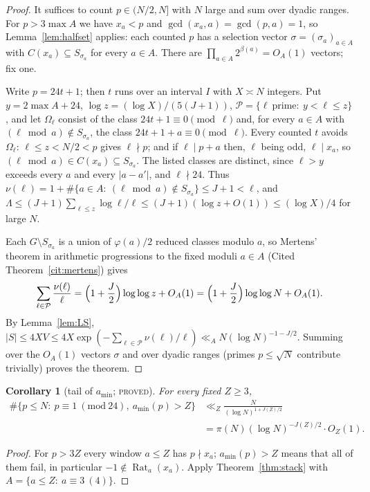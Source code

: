 \documentclass[11pt,reqno]{amsart}
\newtheorem{corollary}[theorem]{Corollary}
\theoremstyle{definition}
\newcommand{\Rat}{\operatorname{Rat}}
\newcommand{\amin}{a_{\min}}
\newcommand{\status}[1]{\textup{\textsc{#1}}}
\begin{document}
\begin{proof}
It suffices to count $p\in(N/2,N]$ with $N$ large and sum over dyadic
ranges.  For $p>3\max A$ we have $x_a<p$ and $\gcd(x_a,a)=\gcd(p,a)=1$, so
Lemma~\ref{lem:halfset} applies: each counted $p$ has a selection vector
$\sigma=(\sigma_a)_{a\in A}$ with $C(x_a)\subseteq S_{\sigma_a}$ for every
$a\in A$.  There are $\prod_{a\in A}2^{\beta(a)}=O_A(1)$ vectors; fix one.

Write $p=24t+1$; then $t$ runs over an interval $I$ with
$X\asymp N$ integers.  Put $y=2\max A+24$, $\log z=(\log X)/(5(J+1))$,
$\mathcal P=\{\ell\ \text{prime}:\ y<\ell\le z\}$, and let $\Omega_\ell$
consist of the class $24t+1\equiv0\pmod\ell$ and, for every $a\in A$ with
$(\ell\bmod a)\notin S_{\sigma_a}$, the class $24t+1+a\equiv0\pmod\ell$.
Every counted $t$ avoids $\Omega_\ell$: $\ell\le z<N/2<p$ gives $\ell\nmid p$;
and if $\ell\mid p+a$ then, $\ell$ being odd, $\ell\mid x_a$, so
$(\ell\bmod a)\in C(x_a)\subseteq S_{\sigma_a}$.  The listed classes are
distinct, since $\ell>y$ exceeds every $a$ and every $|a-a'|$, and
$\ell\nmid24$.  Thus $\nu(\ell)=1+\#\{a\in A:\ (\ell\bmod a)\notin
S_{\sigma_a}\}\le J+1<\ell$, and
$\Lambda\le(J+1)\sum_{\ell\le z}\log\ell/\ell\le(J+1)(\log z+O(1))\le(\log X)/4$
for large $N$.

Each $G\setminus S_{\sigma_a}$ is a union of $\varphi(a)/2$ reduced classes
modulo $a$, so Mertens' theorem in arithmetic progressions to the fixed
moduli $a\in A$ (Cited Theorem~\ref{cit:mertens}) gives
\[
 \sum_{\ell\in\mathcal P}\frac{\nu(\ell)}\ell
 =\Bigl(1+\frac J2\Bigr)\log\log z+O_A(1)
 =\Bigl(1+\frac J2\Bigr)\log\log N+O_A(1).
\]
By Lemma~\ref{lem:LS},
$|S|\le4XV\le4X\exp(-\sum_{\ell\in\mathcal P}\nu(\ell)/\ell)\ll_A N(\log N)^{-1-J/2}$.
Summing over the $O_A(1)$ vectors $\sigma$ and over dyadic ranges
(primes $p\le\sqrt N$ contribute trivially) proves the theorem.
\end{proof}

\begin{corollary}[tail of $\amin$; \status{proved}]\label{cor:tail}
For every fixed $Z\ge3$,
\begin{align*}
 \#\{p\le N:\ p\equiv1\ (\mathrm{mod}\ 24),\ \amin(p)>Z\}&\ll_Z\frac N{(\log N)^{1+J(Z)/2}}\\
 &=\pi(N)(\log N)^{-J(Z)/2}\cdot O_Z(1).
\end{align*}
\end{corollary}

\begin{proof}
For $p>3Z$ every window $a\le Z$ has $p\nmid x_a$; $\amin(p)>Z$ means
that all of them fail, in particular $-1\notin\Rat_a(x_a)$.  Apply
Theorem~\ref{thm:stack} with $A=\{a\le Z:\ a\equiv3\ (4)\}$.
\end{proof}
\end{document}
